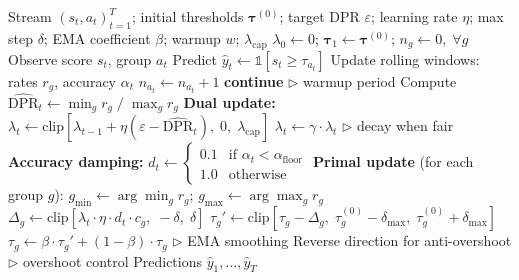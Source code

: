 \documentclass[10pt,twocolumn]{article}
\theoremstyle{definition}
\begin{document}
\begin{algorithm}[t]
\caption{CODA Online Adaptation}
\label{alg:coda}
\begin{algorithmic}[1]
\REQUIRE Stream $(s_t, a_t)_{t=1}^T$; initial thresholds $\boldsymbol{\tau}^{(0)}$; target DPR $\varepsilon$; learning rate $\eta$; max step $\delta$; EMA coefficient $\beta$; warmup $w$; $\lambda_{\text{cap}}$
\STATE $\lambda_0 \gets 0$; $\boldsymbol{\tau}_1 \gets \boldsymbol{\tau}^{(0)}$; $n_g \gets 0, \; \forall g$
    \STATE Observe score $s_t$, group $a_t$
    \STATE Predict $\hat{y}_t \gets \mathbb{1}[s_t \geq \tau_{a_t}]$
    \STATE Update rolling windows: rates $r_g$, accuracy $\alpha_t$
    \STATE $n_{a_t} \gets n_{a_t} + 1$
        \STATE \textbf{continue} \hfill $\triangleright$ warmup period
    \ENDIF
    \STATE Compute $\widehat{\text{DPR}}_t \gets \min_g r_g \;/\; \max_g r_g$
    \STATE \textbf{Dual update:}
    \STATE $\lambda_t \gets \text{clip}\left[\lambda_{t-1} + \eta(\varepsilon - \widehat{\text{DPR}}_t), \; 0, \; \lambda_{\text{cap}}\right]$
        \STATE $\lambda_t \gets \gamma \cdot \lambda_t$ \hfill $\triangleright$ decay when fair
    \ENDIF
    \STATE \textbf{Accuracy damping:}
    \STATE $d_t \gets \begin{cases} 0.1 & \text{if } \alpha_t < \alpha_{\text{floor}} \\ 1.0 & \text{otherwise}\end{cases}$
    \STATE \textbf{Primal update} (for each group $g$):
    \STATE $g_{\min} \gets \arg\min_g r_g$; \quad $g_{\max} \gets \arg\max_g r_g$
    \STATE $\Delta_g \gets \text{clip}\left[\lambda_t \cdot \eta \cdot d_t \cdot c_g, \; -\delta, \; \delta\right]$
    \STATE $\tau_g' \gets \text{clip}\left[\tau_g - \Delta_g, \; \tau_g^{(0)} - \delta_{\max}, \; \tau_g^{(0)} + \delta_{\max}\right]$
    \STATE $\tau_g \gets \beta \cdot \tau_g' + (1-\beta) \cdot \tau_g$ \hfill $\triangleright$ EMA smoothing
        \STATE Reverse direction for anti-overshoot \hfill $\triangleright$ overshoot control
    \ENDIF
\ENDFOR
\RETURN Predictions $\hat{y}_1, \ldots, \hat{y}_T$
\end{algorithmic}
\end{algorithm}
\end{document}
